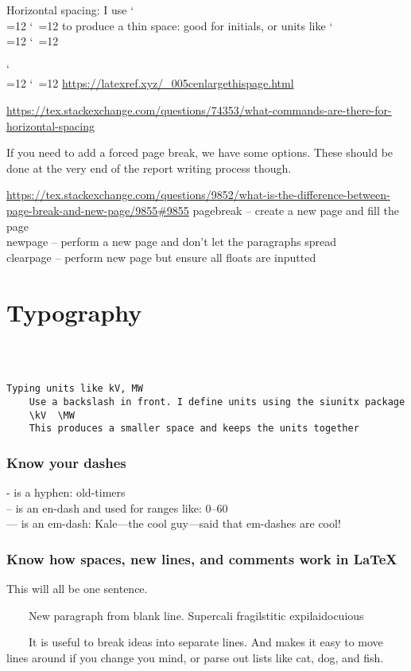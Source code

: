 \documentclass{\FormatDir corpboreportMulti}
\def\cmd{\bgroup\catcode`\\=12 \catcode`\ =12 \cmdA}
\def\cmdA#1{\egroup{\texttt{\detokenize{#1}}}}
\begin{document}
Horizontal spacing: I use \cmd{\,} to produce a thin space: good for initials, or units like \cmd{K.\,Ewasiuk, 177\,lbs}

\cmd{\enlargethispage} \url{https://latexref.xyz/_005cenlargethispage.html}

\url{https://tex.stackexchange.com/questions/74353/what-commands-are-there-for-horizontal-spacing}


If you need to add a forced page break, we have some options. These should be done at the very end of the report writing process though.

\url{https://tex.stackexchange.com/questions/9852/what-is-the-difference-between-page-break-and-new-page/9855#9855}
pagebreak -- create a new page and fill the page\\
newpage  -- perform a new page and don't let the paragraphs spread\\
clearpage -- perform new page but ensure all floats are inputted\\



\section{Typography}

\begin{lstlisting}



Typing units like kV, MW
	Use a backslash in front. I define units using the siunitx package
	\kV  \MW
	This produces a smaller space and keeps the units together
\end{lstlisting}


\subsubsection{Know your dashes}
\begin{LTXexample}
- is a hyphen: old-timers\\
-- is an en-dash and used for ranges like: 0--60\\
--- is an em-dash: Kale---the cool guy---said that
       em-dashes are cool!
\end{LTXexample}



\subsubsection{Know how spaces, new lines, and comments work in LaTeX}
\begin{LTXexample}
This will all
be one sentence.

\ \ \ \ New paragraph from blank line.
Supercali%
fragilstitic%
expilaidocuious  %

\ \ \ \ It is useful to break ideas
into separate lines.
And makes it easy to
move lines around
if you change you mind, or
parse out lists like
cat,
dog, and
fish.
\end{LTXexample}
\end{document}
